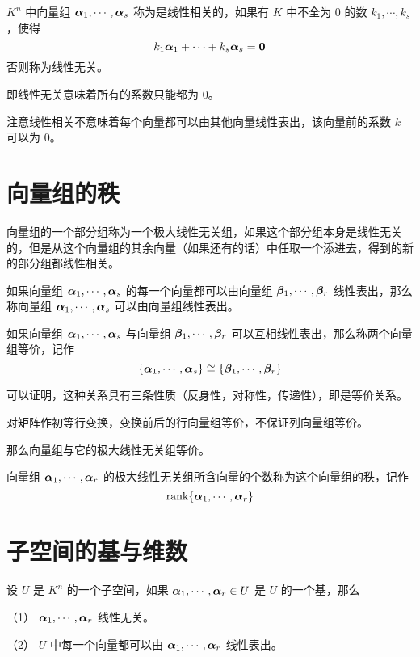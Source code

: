 \begin{definition}
	$K^n$ 中向量组 $\boldsymbol{\alpha}_1,\cdots,\boldsymbol{\alpha}_s$ 称为是线性相关的，如果有 $K$ 中不全为 $0$ 的数 $k_1,\cdots,k_s$，使得
	$$k_1\boldsymbol{\alpha}_1+\cdots+k_s\boldsymbol{\alpha}_s=\boldsymbol{0}$$
	否则称为线性无关。
\end{definition}

即线性无关意味着所有的系数只能都为 $0$。

注意线性相关不意味着每个向量都可以由其他向量线性表出，该向量前的系数 $k$ 可以为 $0$。

\section{向量组的秩}

\begin{definition}[极大线性无关组]
	向量组的一个部分组称为一个极大线性无关组，如果这个部分组本身是线性无关的，但是从这个向量组的其余向量（如果还有的话）中任取一个添进去，得到的新的部分组都线性相关。
\end{definition}

如果向量组 $\boldsymbol{\alpha}_1,\cdots,\boldsymbol{\alpha}_s$ 的每一个向量都可以由向量组 $\boldsymbol{\beta}_1,\cdots,\boldsymbol{\beta}_r$ 线性表出，那么称向量组 $\boldsymbol{\alpha}_1,\cdots,\boldsymbol{\alpha}_s$ 可以由向量组线性表出。

\begin{definition}
	如果向量组 $\boldsymbol{\alpha}_1,\cdots,\boldsymbol{\alpha}_s$ 与向量组 $\boldsymbol{\beta}_1,\cdots,\boldsymbol{\beta}_r$ 可以互相线性表出，那么称两个向量组等价，记作
	$$\{\boldsymbol{\alpha}_1,\cdots,\boldsymbol{\alpha}_s\} \cong \{\boldsymbol{\beta}_1,\cdots,\boldsymbol{\beta}_r\}$$
\end{definition}

可以证明，这种关系具有三条性质（反身性，对称性，传递性），即是等价关系。

对矩阵作初等行变换，变换前后的行向量组等价，不保证列向量组等价。

那么向量组与它的极大线性无关组等价。

\begin{definition}
	向量组 $\boldsymbol{\alpha}_1,\cdots,\boldsymbol{\alpha}_r$ 的极大线性无关组所含向量的个数称为这个向量组的秩，记作
	$$\operatorname{rank}\{\boldsymbol{\alpha}_1,\cdots,\boldsymbol{\alpha}_r\}$$
\end{definition}

\section{子空间的基与维数}

\begin{definition}
	设 $U$ 是 $K^n$ 的一个子空间，如果 $\boldsymbol{\alpha}_1,\cdots,\boldsymbol{\alpha}_r\in U$ 是 $U$ 的一个基，那么

	（1） $\boldsymbol{\alpha}_1,\cdots,\boldsymbol{\alpha}_r$ 线性无关。

	（2） $U$ 中每一个向量都可以由 $\boldsymbol{\alpha}_1,\cdots,\boldsymbol{\alpha}_r$ 线性表出。
\end{definition}


